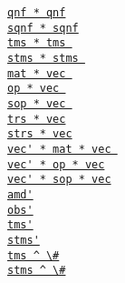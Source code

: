 \documentclass{timesjhep}
\begin{document}
\begin{multicols}{3}
    \href{}{\lstinline|qnf * qnf|}\\
    \href{}{\lstinline|sqnf * sqnf|}\\
    \href{}{\lstinline|tms * tms |}\\
    \href{}{\lstinline|stms * stms |}\\
    \href{}{\lstinline|mat * vec |}\\
    \href{}{\lstinline|op * vec |}\\
    \href{}{\lstinline|sop * vec |}\\
    \href{}{\lstinline|trs * vec|}\\
    \href{}{\lstinline|strs * vec|}\\
    \href{}{\lstinline|vec' * mat * vec |}\\
    \href{}{\lstinline|vec' * op * vec|}\\
    \href{}{\lstinline|vec' * sop * vec|}\\
    \href{}{\lstinline|amd'|}\\
    \href{}{\lstinline|obs'|}\\
    \href{}{\lstinline|tms'|}\\
    \href{}{\lstinline|stms'|}\\
    \href{}{\lstinline|tms ^ \#|}\\
    \href{}{\lstinline|stms ^ \#|}\\
\end{multicols}

\clearpage

\end{document}
